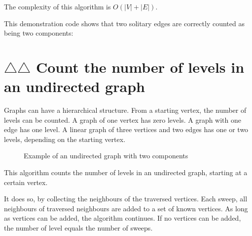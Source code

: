 The complexity of this algorithm is 
$O(\left|V\right|+\left|E\right|)$.

This demonstration code shows that two solitary edges are correctly counted
as being two components:



\section{$\triangle$$\triangle$ Count the number of levels in an undirected graph}
\label{subsec:count_undirected_graph_levels}

Graphs can have a hierarchical structure.
From a starting vertex, the number of levels can be counted.
A graph of one vertex has zero levels.
A graph with one edge has one level.
A linear graph of three vertices and two edges has one or two levels, depending
on the starting vertex.

\begin{figure}
  \caption{Example of an undirected graph with two components}
  \label{fig:count_undirected_graph_levels}
\end{figure}

This algorithm counts the number of levels in an undirected graph, starting
at a certain vertex.

It does so, by collecting the neighbours of the traversed vertices.
Each sweep, all neighbours of traversed neighbours are added to a set of
known vertices.
As long as vertices can be added, the algorithm continues.
If no vertices can be added, the number of level equals the number of sweeps.



